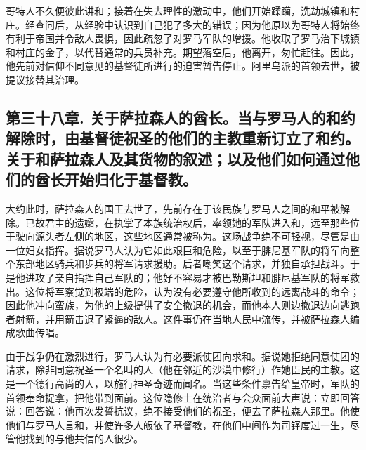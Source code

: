 哥特人不久便彼此讲和；接着在失去理性的激动中，他们开始蹂躏，洗劫城镇和村庄。经查问后，从经验中认识到自己犯了多大的错误；因为他原以为哥特人将始终有利于帝国并令敌人畏惧，因此疏忽了对罗马军队的增援。他收取了罗马治下城镇和村庄的金子，以代替通常的兵员补充。期望落空后，他离开，匆忙赶往。因此，他先前对信仰不同意见的基督徒所进行的迫害暂告停止。阿里乌派的首领去世，被提议接替其治理。\par


\subsection{第三十八章. 关于萨拉森人的酋长。当与罗马人的和约解除时，由基督徒祝圣的他们的主教重新订立了和约。关于和萨拉森人及其货物的叙述；以及他们如何通过他们的酋长开始归化于基督教。}

大约此时，萨拉森人的国王去世了，先前存在于该民族与罗马人之间的和平被解除。已故君主的遗孀，在执掌了本族统治权后，率领她的军队进入和，远至那些位于驶向源头者左侧的地区，这些地区通常被称为。这场战争绝不可轻视，尽管是由一位妇女指挥。据说罗马人认为它如此艰巨和危险，以至于腓尼基军队的将军向整个东部地区骑兵和步兵的将军请求援助。后者嘲笑这个请求，并独自承担战斗。于是他进攻了亲自指挥自己军队的；他好不容易才被巴勒斯坦和腓尼基军队的将军救出。这位将军察觉到极端的危险，认为没有必要遵守他所收到的远离战斗的命令；因此他冲向蛮族，为他的上级提供了安全撤退的机会，而他本人则边撤退边向逃跑者射箭，并用箭击退了紧逼的敌人。这件事仍在当地人民中流传，并被萨拉森人编成歌曲传唱。\par

由于战争仍在激烈进行，罗马人认为有必要派使团向求和。据说她拒绝同意使团的请求，除非同意祝圣一个名叫的人（他在邻近的沙漠中修行）作她臣民的主教。这是一个德行高尚的人，以施行神圣奇迹而闻名。当这些条件禀告给皇帝时，军队的首领奉命捉拿，把他带到面前。这位隐修士在统治者与会众面前大声说：立即回答说：回答说：他再次发誓抗议，绝不接受他们的祝圣，便去了萨拉森人那里。他使他们与罗马人言和，并使许多人皈依了基督教，在他们中间作为司铎度过一生，尽管他找到的与他共信的人很少。\par

